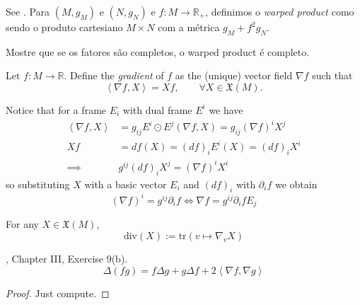 \medskip\noindent

\begin{exercise}
\label{exercise-wraped-product}
See \cite{pet}. Para $(M,g_M)$ e $(N,g_N)$ e
$f:M \to \mathbb{R}_+$, definimos o
 {\it warped product} como sendo o produto
 cartesiano $M\times N$ com a métrica
 $g_M+f^2g_N$.

Mostre que se os fatores são completos, o
warped product é completo.
\end{exercise}

\begin{definition}
\label{definition-gradient}
Let  $f:M\to\mathbb{R}$. Define the {\it
gradient} of $f$ as the (unique) vector
field $\nabla f$ such that
\begin{equation}
\label{equation-gradient}
\left\langle{}\nabla f,X\right\rangle{}=Xf, \qquad \forall
X\in\mathfrak{X}(M).
\end{equation}
\end{definition}

Notice that for a frame $E_i$ with dual frame
$E^i$ we have
$$
\begin{aligned}
\left\langle{}\nabla f,X\right\rangle{}&=g_{ij}E^i\odot
E^j(\nabla f,X)
=g_{ij}(\nabla f)^iX^j\\
Xf&=df(X)=(df)_iE^i(X)=(df)_iX^i\\
\implies& g^{ij}(df)_iX^j=(\nabla f)^iX^i
\end{aligned}
$$
so substituting $X$ with a basic vector $E_i$
and $(df)_i$ with $\partial_if$ we
obtain
\begin{equation}
\label{equation-gradient-in-coordinates}
(\nabla f)^i=g^{ij}\partial_if \iff \nabla
f=g^{ij}\partial_ifE_j
\end{equation}

\begin{definition}
\label{definition-divergence}
For any $X\in \mathfrak{X}(M)$,
$$
\text{div}(X):=\text{tr}(v\mapsto \nabla_vX)
$$
\end{definition}

\begin{lemma}
\label{lemma-Laplacian-of-product}
\cite{doc}, Chapter III, Exercise 9(b).
\begin{equation}
\label{equation-Laplacian-of-product}
\Delta(fg)=f \Delta g + g \Delta
f+2\left\langle{}\nabla f,\nabla g\right\rangle{}
\end{equation}
\end{lemma}

\begin{proof}
Just compute.
\end{proof}

